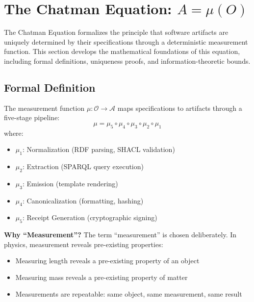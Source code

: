 \section{The Chatman Equation: \(A = \mu(O)\)}

The Chatman Equation formalizes the principle that software artifacts are uniquely determined by their specifications through a deterministic measurement function. This section develops the mathematical foundations of this equation, including formal definitions, uniqueness proofs, and information-theoretic bounds.

\subsection{Formal Definition}

\begin{definition}
    The measurement function \(\mu: \mathcal{O} \rightarrow \mathcal{A}\) maps specifications to artifacts through a five-stage pipeline:
    \begin{equation}
        \mu = \mu_5 \circ \mu_4 \circ \mu_3 \circ \mu_2 \circ \mu_1
    \end{equation}
    where:
    \begin{itemize}
        \item \(\mu_1\): Normalization (RDF parsing, SHACL validation)
        \item \(\mu_2\): Extraction (SPARQL query execution)
        \item \(\mu_3\): Emission (template rendering)
        \item \(\mu_4\): Canonicalization (formatting, hashing)
        \item \(\mu_5\): Receipt Generation (cryptographic signing)
    \end{itemize}
\end{definition}

\textbf{Why ``Measurement''?} The term ``measurement'' is chosen deliberately. In physics, measurement reveals pre-existing properties:
\begin{itemize}
    \item Measuring length reveals a pre-existing property of an object
    \item Measuring mass reveals a pre-existing property of matter
    \item Measurements are repeatable: same object, same measurement, same result
\end{itemize}

